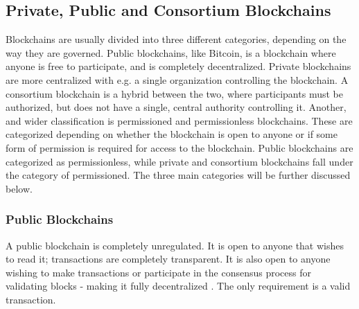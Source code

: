 
\subsection{Private, Public and Consortium Blockchains}
Blockchains are usually divided into three different categories, depending on the way they are governed. \cite{Ethereum_pub_priv} %
Public blockchains, like Bitcoin, is a blockchain where anyone is free to participate, and is completely decentralized. Private blockchains are more centralized with e.g. a single organization controlling the blockchain. A consortium blockchain is a hybrid between the two, where participants must be authorized, but does not have a single, central authority controlling it. Another, and wider classification is permissioned and permissionless blockchains. These are categorized depending on whether the blockchain is open to anyone or if some form of permission is required for access to the blockchain. Public blockchains are categorized as permissionless, while private and consortium blockchains fall under the category of permissioned. The three main categories will be further discussed below.


\subsubsection*{Public Blockchains}
A public blockchain is completely unregulated. It is open to anyone that wishes to read it; transactions are completely transparent. It is also open to anyone wishing to make transactions or participate in the consensus process for validating blocks - making it fully decentralized \cite{Ethereum_pub_priv}. The only requirement is a valid transaction. 


